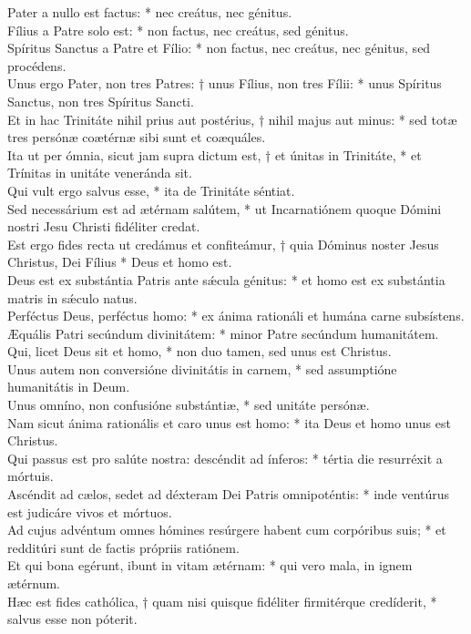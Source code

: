 {	Pater a nullo est factus: * nec creátus, nec génitus. \\
	Fílius a Patre solo est: * non factus, nec creátus, sed génitus. \\
	Spíritus Sanctus a Patre et Fílio: * non factus, nec creátus, nec génitus, sed procédens. \\
	Unus ergo Pater, non tres Patres: † unus Fílius, non tres Fílii: * unus Spíritus Sanctus, non tres Spíritus Sancti. \\
	Et in hac Trinitáte nihil prius aut postérius, † nihil majus aut minus: * sed totæ tres persónæ coætérnæ sibi sunt et coæquáles. \\
	Ita ut per ómnia, sicut jam supra dictum est, † et únitas in Trinitáte, * et Trínitas in unitáte veneránda sit. \\
	Qui vult ergo salvus esse, * ita de Trinitáte séntiat. \\
	Sed necessárium est ad ætérnam salútem, * ut Incarnatiónem quoque Dómini nostri Jesu Christi fidéliter credat. \\
	Est ergo fides recta ut credámus et confiteámur, † quia Dóminus noster Jesus Christus, Dei Fílius * Deus et homo est. \\
	Deus est ex substántia Patris ante sǽcula génitus: * et homo est ex substántia matris in sǽculo natus. \\
	Perféctus Deus, perféctus homo: * ex ánima rationáli et humána carne subsístens. \\
	Æquális Patri secúndum divinitátem: * minor Patre secúndum humanitátem. \\
	Qui, licet Deus sit et homo, * non duo tamen, sed unus est Christus. \\
	Unus autem non conversióne divinitátis in carnem, * sed assumptióne humanitátis in Deum. \\
	Unus omníno, non confusióne substántiæ, * sed unitáte persónæ. \\
	Nam sicut ánima rationális et caro unus est homo: * ita Deus et homo unus est Christus. \\
	Qui passus est pro salúte nostra: descéndit ad ínferos: * tértia die resurréxit a mórtuis. \\
	Ascéndit ad cælos, sedet ad déxteram Dei Patris omnipoténtis: * inde ventúrus est judicáre vivos et mórtuos. \\
	Ad cujus advéntum omnes hómines resúrgere habent cum corpóribus suis; * et redditúri sunt de factis própriis ratiónem. \\
	Et qui bona egérunt, ibunt in vitam ætérnam: * qui vero mala, in ignem ætérnum. \\
	Hæc est fides cathólica, † quam nisi quisque fidéliter firmitérque credíderit, * salvus esse non póterit. \\
}

